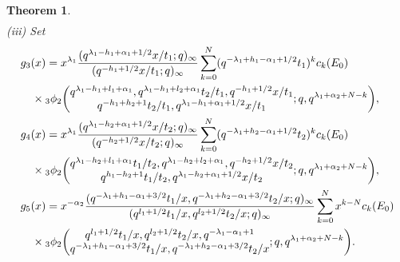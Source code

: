 \documentclass[12pt]{amsart}
\numberwithin{equation}{section}
\newtheorem{thm}{Theorem}[section]
\theoremstyle{definition}
\theoremstyle{remark}
\begin{document}
\begin{thm}
\begin{align*}
  \end{align*}
(iii) Set
\begin{align*}
& g_{3}(x) = x^{ \lambda _{1} } \frac{( q^{ \lambda _{1} - h_{1} + \alpha _{1} + 1/2}x/t_{1}; q)_\infty}{( q^{-h_{1} + 1/2}x/t_{1}; q)_\infty}  \sum_{k = 0}^{N} (q^{- \lambda _{1} + h_{1}  - \alpha _{1} + 1/2}t_{1})^k c_{k} (E_{0})  \notag \\
  &\quad \times {}_3\phi_2 \biggl( \begin{array}{@{}c@{}} q^{ \lambda _{1} -h_{1} + l_{1} + \alpha _{1} }, q^{ \lambda _{1} -h_{1} + l_{2} + \alpha _{1} }t_{2}/t_{1}, q^{-h_{1} + 1/2}x/t_{1} \\
     q^{- h_{1} + h_{2} + 1}t_{2}/t_{1}, q^{ \lambda _{1} - h_{1} + \alpha _{1} + 1/2}x/t_{1} \end{array} ;q,q^{ \lambda _{1}  + \alpha_{2} +N  - k} \biggr), \\
  &  g_{4}(x) = x^{ \lambda _{1} } \frac{( q^{ \lambda _{1} - h_{2} + \alpha _{1} + 1/2}x/t_{2}; q)_\infty}{( q^{-h_{2} + 1/2}x/t_{2}; q)_\infty}  \sum_{k = 0}^{N}  (q^{- \lambda _{1} +h_{2} - \alpha _{1} + 1/2}t_{2})^k c_{k} (E_{0}) \notag \\
  &\quad \times {}_3\phi_2 \biggl( \begin{array}{@{}c@{}} q^{ \lambda _{1} -h_{2} + l_{1} + \alpha _{1} }t_{1}/t_{2}, q^{ \lambda _{1} -h_{2} + l_{2} + \alpha _{1} }, q^{-h_{2} + 1/2}x/t_{2} \\
     q^{h_{1} - h_{2} + 1}t_{1}/t_{2}, q^{ \lambda _{1} - h_{2} + \alpha _{1} + 1/2}x/t_{2} \end{array} ;q,q^{ \lambda _{1}  + \alpha_{2} +N - k} \biggr), \\
 & g_{5}(x) = x^{ - \alpha_{2} } \frac{(q^{- \lambda _{1} + h_{1} - \alpha _{1} + 3/2}t_{1}/x, q^{- \lambda _{1} + h_{2} - \alpha _{1} + 3/2}t_{2}/x ; q)_{\infty}}{(q^{l_{1} + 1/2}t_{1}/x, q^{l_{2} + 1/2}t_{2}/x ; q)_{\infty}} \sum_{k = 0}^{N} x^{k-N} c_{k}  (E_{0}) \notag \\
  &\quad \times  {}_3\phi_2 \biggl( \begin{array}{@{}c@{}} q^{l_{1} + 1/2}t_{1}/x, q^{l_{2} + 1/2}t_{2}/x, q^{- \lambda _{1} - \alpha _{1} + 1} \\
     q^{- \lambda _{1} + h_{1} - \alpha _{1} + 3/2}t_{1}/x, q^{- \lambda _{1} + h_{2} - \alpha _{1} + 3/2}t_{2}/x \end{array} ;q,q^{ \lambda _{1}  + \alpha_{2} +N - k} \biggr).

\end{align*}
\end{thm}
\end{document}
